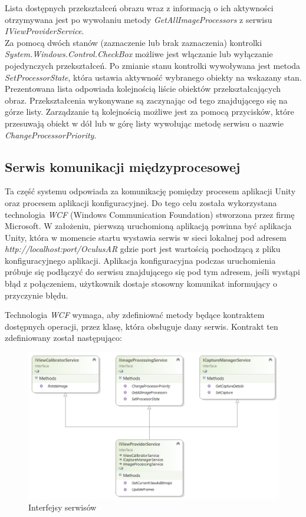 \documentclass[a4paper,11pt,twoside]{report}
\theoremstyle{definition}
\begin{document}
\begin{description}
Lista dostępnych przekształceń obrazu wraz z informacją o ich aktywności otrzymywana jest po wywołaniu metody \textit{GetAllImageProcessors} z serwisu \textit{IViewProviderService}. \\
Za pomocą dwóch stanów (zaznaczenie lub brak zaznaczenia) kontrolki \textit{System.Windows.Control.CheckBox} możliwe jest włączanie lub wyłączanie pojedynczych przekształceń. Po zmianie stanu kontrolki wywoływana jest metoda \textit{SetProcessorState}, która ustawia aktywność wybranego obiekty na wskazany stan. \\
Prezentowana lista odpowiada kolejnością liście obiektów przekształcających obraz.  Przekształcenia wykonywane są zaczynając od tego znajdującego się na górze listy. Zarządzanie tą kolejnością możliwe jest za pomocą przycisków, które przesuwają obiekt w dół lub w górę listy wywołując metodę serwisu o nazwie \textit{ChangeProcessorPriority}.

\end{description}

\subsection{Serwis komunikacji międzyprocesowej}

Ta część systemu odpowiada za komunikację pomiędzy procesem aplikacji Unity oraz procesem aplikacji konfiguracyjnej.  Do tego celu została wykorzystana technologia \textit{WCF}  (Windows Communication Foundation) stworzona przez firmę Microsoft. W założeniu, pierwszą uruchomioną aplikacją powinna być aplikacja Unity, która w momencie startu wystawia serwis w sieci lokalnej pod adresem \textit{http://localhost:{port}/OculusAR} gdzie port jest wartością pochodzącą z pliku konfiguracyjnego aplikacji. Aplikacja konfiguracyjna podczas uruchomienia próbuje się podłączyć do serwisu znajdującego się pod tym adresem, jeśli wystąpi błąd z połączeniem, użytkownik dostaje stosowny komunikat informujący o przyczynie błędu. 

Technologia \textit{WCF} wymaga, aby zdefiniować metody będące kontraktem dostępnych operacji, przez klasę, która obsługuje dany serwis. Kontrakt ten zdefiniowany został następująco:
\begin{figure}[h]
\centering
\includegraphics[scale=0.9]{images/IViewProviderService}
\caption[Serwisy diagram]{Interfejsy serwisów}
\end{figure}
 
\end{document}

